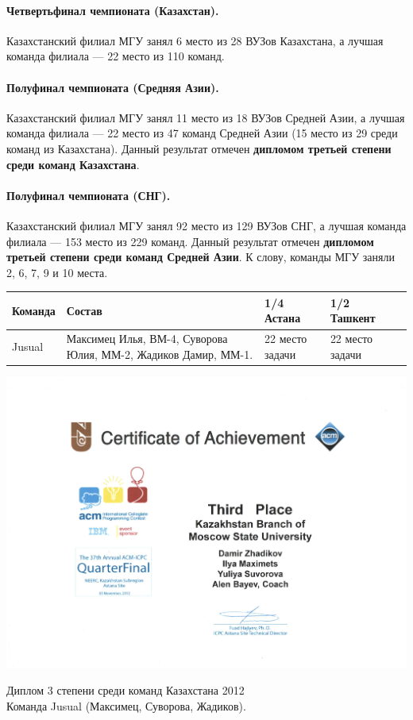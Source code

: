 \paragraph{Четвертьфинал чемпионата (Казахстан).} Казахстанский филиал МГУ занял 6 место из 28 ВУЗов Казахстана, а лучшая команда филиала --- 22 место из 110 команд.

\paragraph{Полуфинал чемпионата (Средняя Азии).} Казахстанский филиал МГУ занял 11 место из 18 ВУЗов Средней Азии, а лучшая команда филиала --- 22 место из 47 команд Средней Азии (15 место из 29 среди команд из Казахстана). Данный результат отмечен \textbf{дипломом третьей степени среди команд Казахстана}.

\paragraph{Полуфинал чемпионата (СНГ).} Казахстанский филиал МГУ занял 92 место из 129 ВУЗов СНГ, а лучшая команда филиала --- 153 место из 229 команд. Данный результат отмечен \textbf{дипломом третьей степени среди команд Средней Азии}. К слову, команды МГУ заняли 2, 6, 7, 9 и 10 места.

\begin{center}
\begin{tabular}{|p{1.8cm}|p{5.5cm}|p{1.5cm}|p{1.6cm}|l|}
\hline
Команда & Состав & 1/4 \newline Астана & 1/2 \newline Ташкент\\
\hline
Jusual &
Максимец Илья, ВМ-4, \newline
Суворова Юлия, ММ-2, \newline
Жадиков Дамир, ММ-1. 
&
22 место \newline
4 задачи
&
22 место \newline
2 задачи
\\
\hline
\end{tabular}
\end{center}

\newpage
\begin{center}
\includegraphics[width=0.7\linewidth]{diploma/2012-astana}

Диплом 3 степени среди команд Казахстана 2012\\
Команда Jusual (Максимец, Суворова, Жадиков).
\end{center}

